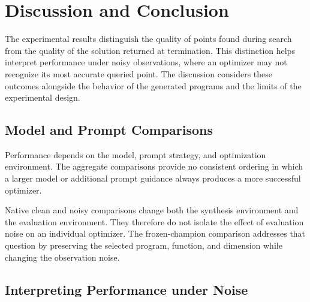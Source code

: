 \chapter{Discussion and Conclusion}
\label{chap:discussion}


The experimental results distinguish the quality of points found during
search from the quality of the solution returned at termination. This
distinction helps interpret performance under noisy observations, where
an optimizer may not recognize its most accurate queried point.
The discussion considers these outcomes alongside the behavior of the
generated programs and the limits of the experimental design.

\section{Model and Prompt Comparisons}
\label{sec:discussion_model_prompts}

Performance depends on the model, prompt strategy, and optimization
environment. The aggregate comparisons provide no consistent ordering
in which a larger model or additional prompt guidance always produces
a more successful optimizer.

Native clean and noisy comparisons change both the synthesis environment
and the evaluation environment. They therefore do not isolate the effect
of evaluation noise on an individual optimizer. The frozen-champion
comparison addresses that question by preserving the selected program,
function, and dimension while changing the observation noise.

\section{Interpreting Performance under Noise}
\label{sec:discussion_noise}

